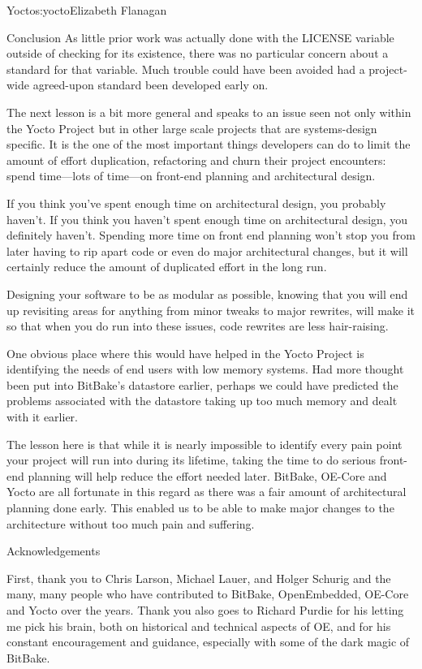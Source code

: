 \begin{aosachapter}{Yocto}{s:yocto}{Elizabeth Flanagan}
\begin{aosasect1}{Conclusion}
As little prior work was actually done with the LICENSE variable
outside of checking for its existence, there was no particular concern
about a standard for that variable. Much trouble could have been
avoided had a project-wide agreed-upon standard been developed early
on.

The next lesson is a bit more general and speaks to an issue seen not
only within the Yocto Project but in other large scale projects that 
are systems-design specific. It is the one of the
most important things developers can do to limit the amount of effort
duplication, refactoring and churn their project encounters: spend
time---lots of time---on front-end planning and architectural
design.

If you think you've spent enough time on architectural design, you
probably haven't. If you think you haven't spent enough time on
architectural design, you definitely haven't. Spending more time on
front end planning won't stop you from later having to rip apart code
or even do major architectural changes, but it will certainly reduce
the amount of duplicated effort in the long run. 

Designing
your software to be as modular as possible, knowing that you will end
up revisiting areas for anything from minor tweaks to major rewrites,
will make it so that when you do run into these issues, code rewrites
are less hair-raising.

One obvious place where this would have helped in the Yocto
Project is identifying the
needs of end users with low memory systems. Had more thought been put
into BitBake's datastore earlier, perhaps we could have predicted the
problems associated with the datastore taking up too much memory and
dealt with it earlier.

The lesson here is that while it is nearly impossible to identify
every pain point your project will run into during its lifetime,
taking the time to do serious front-end planning will help reduce the
effort needed later. BitBake, OE-Core and Yocto are all fortunate in
this regard as there was a fair amount of architectural planning done
early. This enabled us to be able to make major changes to the
architecture without too much pain and suffering.

\end{aosasect1}

\begin{aosasect1}{Acknowledgements}

First, thank you to Chris Larson, Michael Lauer, and Holger
Schurig and the many, many people who have contributed to BitBake,
OpenEmbedded, OE-Core and Yocto over the years. Thank you also goes to
Richard Purdie for his letting me pick his brain, both on historical
and technical aspects of OE, and for his constant encouragement and
guidance, especially with some of the dark magic of BitBake.

\end{aosasect1}

\end{aosachapter}
